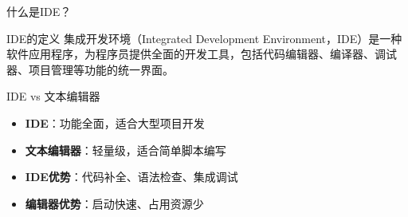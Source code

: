 \documentclass[UTF8,aspectratio=169]{beamer}
\begin{document}
\begin{frame}{什么是IDE？}
    \begin{ytublock}{IDE的定义}
        集成开发环境（Integrated Development Environment，IDE）是一种软件应用程序，为程序员提供全面的开发工具，包括代码编辑器、编译器、调试器、项目管理等功能的统一界面。
    \end{ytublock}

    \begin{ytublock}{IDE vs 文本编辑器}
        \begin{itemize}
            \item \textbf{IDE}：功能全面，适合大型项目开发
            \item \textbf{文本编辑器}：轻量级，适合简单脚本编写
            \item \textbf{IDE优势}：代码补全、语法检查、集成调试
            \item \textbf{编辑器优势}：启动快速、占用资源少
        \end{itemize}
    \end{ytublock}
\end{frame}
\end{document}
